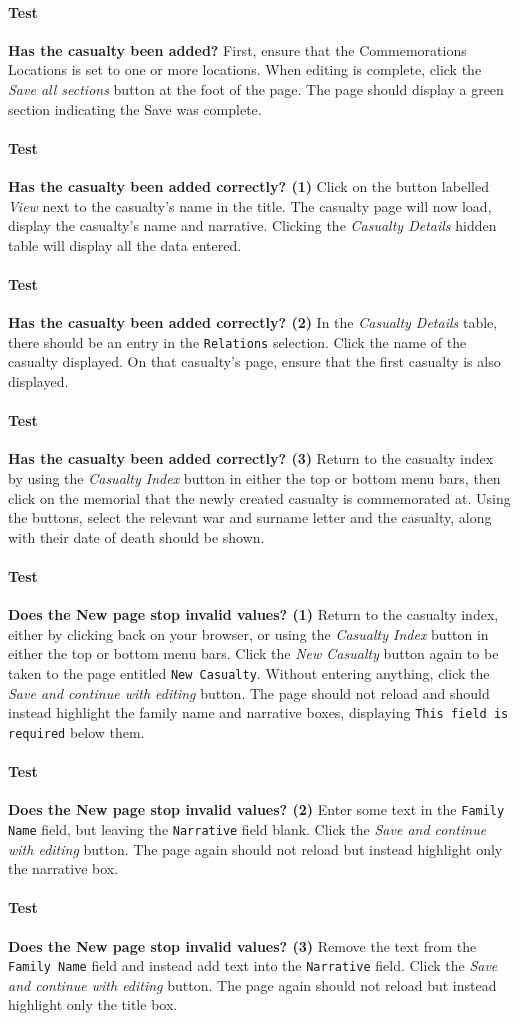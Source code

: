 \documentclass[12pt]{article}
\newcounter{Test}
\newcommand{\test}[1]{%
\stepcounter{Test}%
\paragraph{Test \theTest} \textbf{#1} }
\begin{document}
\test{Has the casualty been added?}
First, ensure that the Commemorations Locations is set to one or more locations. When editing is complete, click the \textit{Save all sections} button at the foot of the page. The page should display a green section indicating the Save was complete.

\test{Has the casualty been added correctly? (1)}
Click on the button labelled \textit{View} next to the casualty's name in the title. The casualty page will now load, display the casualty's name and narrative. Clicking the \textit{Casualty Details} hidden table will display all the data entered.

\test{Has the casualty been added correctly? (2)}
In the \textit{Casualty Details} table, there should be an entry in the \texttt{Relations} selection. Click the name of the casualty displayed. On that casualty's page, ensure that the first casualty is also displayed.

\test{Has the casualty been added correctly? (3)}
Return to the casualty index by using the \textit{Casualty Index} button in either the top or bottom menu bars, then click on the memorial that the newly created casualty is commemorated at. Using the buttons, select the relevant war and surname letter and the casualty, along with their date of death should be shown.

\test{Does the New page stop invalid values? (1)}
Return to the casualty index, either by clicking back on your browser, or using the \textit{Casualty Index} button in either the top or bottom menu bars. Click the \textit{New Casualty} button again to be taken to the page entitled \texttt{New Casualty}. Without entering anything, click the \textit{Save and continue with editing} button. The page should not reload and should instead highlight the family name and narrative boxes, displaying \texttt{This field is required} below them.

\test{Does the New page stop invalid values? (2)}
Enter some text in the \texttt{Family Name} field, but leaving the \texttt{Narrative} field blank. Click the \textit{Save and continue with editing} button. The page again should not reload but instead highlight only the narrative box.

\test{Does the New page stop invalid values? (3)}
Remove the text from the \texttt{Family Name} field and instead add text into the \texttt{Narrative} field. Click the \textit{Save and continue with editing} button. The page again should not reload but instead highlight only the title box.
\end{document}
